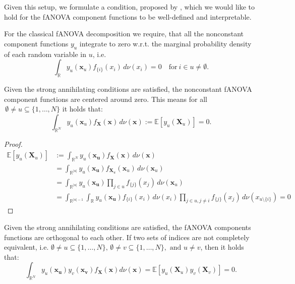 Given this setup, we formulate a condition, proposed by \cite{rahman2014}, which we would like to hold for the fANOVA component functions to be well-defined and interpretable.
\begin{condition}\label{cond:strong_annihilating_conditions}
    For the classical fANOVA decomposition we require, that all the nonconstant component functions $y_u$ integrate to zero w.r.t. the marginal probability density of each random variable in $u$, i.e.
\begin{equation}
    \int_{\mathbb{R}} y_u(\boldsymbol{x}_u) f_{\{i\}}(x_i) \, d\nu(x_i) = 0 \quad \text{for} \ i \in u \neq \emptyset.
\end{equation}
\end{condition}

\begin{proposition}\label{prop:zero_mean_classical}
    Given the strong annihilating conditions are satisfied, the nonconstant fANOVA component functions are centered around zero. This means for all $\, \emptyset \neq u \subseteq \{1, \dots, N\}$ it holds that:
\begin{equation}
    \int_{\mathbb{R}^N} y_u(\boldsymbol{x}_u) f_{\boldsymbol{X}}(\boldsymbol{x}) \, d\nu (\boldsymbol{x}) := \mathbb{E}[y_u(\boldsymbol{X}_u)] = 0.
\end{equation}
\end{proposition}

\begin{proof}
\begin{align*}
    \mathbb{E}[y_u(\boldsymbol{X}_u)] &:= \int_{\mathbb{R}^{N}} y_u(\boldsymbol{x_u}) f_{\boldsymbol{X}}(\boldsymbol{x}) \, d\nu (\boldsymbol{x}) \\
    &= \int_{\mathbb{R}^{|u|}} y_u(\boldsymbol{x_u}) f_{\boldsymbol{X}_u}(\boldsymbol{x}_u) \, d\nu (\boldsymbol{x}_u) \\
    &= \int_{\mathbb{R}^{|u|}} y_u(\boldsymbol{x_u}) \prod_{j \in u} f_{\{j\}}(x_j) \, d\nu (\boldsymbol{x}_u) \\
    &= \int_{\mathbb{R}^{|u|-1}} \int_{\mathbb{R}} y_u(\boldsymbol{x_u}) f_{\{i\}}(x_i) \, d\nu(x_i) \prod_{j \in u, j \neq i} f_{\{j\}}(x_j) \, d\nu (x_{u \setminus \{i\}}) = 0
\end{align*}
\end{proof}

\begin{proposition}\label{prop:orthogonality_classical}
    Given the strong annihilating conditions are satisfied, the fANOVA components functions are orthogonal to each other. If two sets of indices are not completely equivalent, i.e.
    $\emptyset \neq u \subseteq \{1, \dots, N\}, \, \emptyset \neq v \subseteq \{1, \dots, N\}, \text{ and } u \neq v$, then it holds that:
\begin{equation}
    \int_{\mathbb{R}^N} y_u(\boldsymbol{x_u}) y_v(\boldsymbol{x_v}) f_{\boldsymbol{X}}(\boldsymbol{x}) d\nu (\boldsymbol{x}) = \mathbb{E}[y_u(\boldsymbol{X}_u) y_v(\boldsymbol{X}_v)] = 0.
\end{equation}
\end{proposition}

